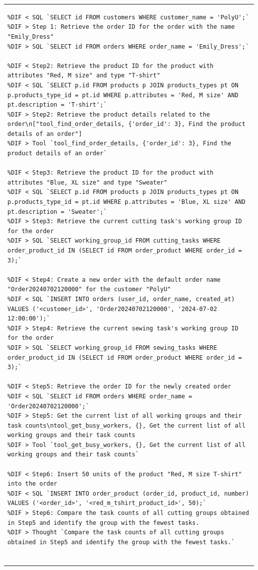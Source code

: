 \documentclass[preprint,12pt]{elsarticle}
\providecommand{\DIFmodbegin}{} %
\begin{document}
\begin{center}
\begin{longtable}{p{390pt}}
\DIFmodbegin
\begin{lstlisting}[style=my_operation, label={lst:chain_of_operation},alsolanguage=DIFcode]
%DIF < Step1: Retrieve the customer ID for the customer with the name "PolyU"
%DIF < SQL `SELECT id FROM customers WHERE customer_name = 'PolyU';`
%DIF > Step 1: Retrieve the order ID for the order with the name "Emily_Dress"
%DIF > SQL `SELECT id FROM orders WHERE order_name = 'Emily_Dress';`

%DIF < Step2: Retrieve the product ID for the product with attributes "Red, M size" and type "T-shirt"
%DIF < SQL `SELECT p.id FROM products p JOIN products_types pt ON p.products_type_id = pt.id WHERE p.attributes = 'Red, M size' AND pt.description = 'T-shirt';`
%DIF > Step2: Retrieve the product details related to the order\n["tool_find_order_details, {'order_id': 3}, Find the product details of an order"]
%DIF > Tool `tool_find_order_details, {'order_id': 3}, Find the product details of an order`

%DIF < Step3: Retrieve the product ID for the product with attributes "Blue, XL size" and type "Sweater"
%DIF < SQL `SELECT p.id FROM products p JOIN products_types pt ON p.products_type_id = pt.id WHERE p.attributes = 'Blue, XL size' AND pt.description = 'Sweater';`
%DIF > Step3: Retrieve the current cutting task's working group ID for the order
%DIF > SQL `SELECT working_group_id FROM cutting_tasks WHERE order_product_id IN (SELECT id FROM order_product WHERE order_id = 3);`

%DIF < Step4: Create a new order with the default order name "Order20240702120000" for the customer "PolyU"
%DIF < SQL `INSERT INTO orders (user_id, order_name, created_at) VALUES ('<customer_id>', 'Order20240702120000', '2024-07-02 12:00:00');`
%DIF > Step4: Retrieve the current sewing task's working group ID for the order
%DIF > SQL `SELECT working_group_id FROM sewing_tasks WHERE order_product_id IN (SELECT id FROM order_product WHERE order_id = 3);`

%DIF < Step5: Retrieve the order ID for the newly created order
%DIF < SQL `SELECT id FROM orders WHERE order_name = 'Order20240702120000';`
%DIF > Step5: Get the current list of all working groups and their task counts\ntool_get_busy_workers, {}, Get the current list of all working groups and their task counts
%DIF > Tool `tool_get_busy_workers, {}, Get the current list of all working groups and their task counts`

%DIF < Step6: Insert 50 units of the product "Red, M size T-shirt" into the order
%DIF < SQL `INSERT INTO order_product (order_id, product_id, number) VALUES ('<order_id>', '<red_m_tshirt_product_id>', 50);`
%DIF > Step6: Compare the task counts of all cutting groups obtained in Step5 and identify the group with the fewest tasks.
%DIF > Thought `Compare the task counts of all cutting groups obtained in Step5 and identify the group with the fewest tasks.`


\end{lstlisting}
\end{longtable}
\end{center}
\end{document}
